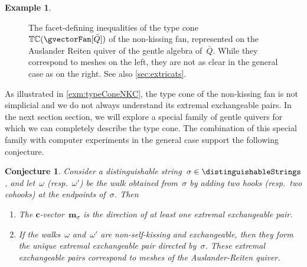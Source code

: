 \documentclass{amsart}
\newtheorem{conjecture}[theorem]{Conjecture}
\theoremstyle{definition}
\newtheorem{example}[theorem]{Example}
\renewcommand{\b}[1]{{\boldsymbol{#1}}} %
\newcommand{\multiplicityVector}{\b{m}} %
\newcommand{\typeCone}{\mathbb{TC}} %
\newcommand{\quiver}{\bar Q} %
\begin{document}
\begin{example}
\begin{figure}[h]
\begin{adjustbox}{center}
    \end{adjustbox}
	\caption{The facet-defining inequalities of the type cone~$\typeCone(\gvectorFan[\quiver])$ of the non-kissing fan, represented on the Auslander Reiten quiver of the gentle algebra of~$\quiver$. While they correspond to meshes on the left, they are not as clear in the general case as on the right. See also \cref{sec:extricats}.}
	\label{fig:labelFacetDefiningInequalititiesNKC}
\end{figure}
\end{example}

As illustrated in \cref{exm:typeConeNKC}, the type cone of the non-kissing fan is not simplicial and we do not always understand its extremal exchangeable pairs.
In the next section section, we will explore a special family of gentle quivers for which we can completely describe the type cone.
The combination of this special family with computer experiments in the general case support the following conjecture.

\begin{conjecture}
Consider a distinguishable string~$\sigma \in \distinguishableStrings$, and let~$\omega$ (resp.~$\omega'$) be the walk obtained from~$\sigma$ by adding two hooks (resp.~two cohooks) at the endpoints of~$\sigma$. Then
\begin{enumerate}
\item The $\b{c}$-vector~$\multiplicityVector_\sigma$ is the direction of at least one extremal exchangeable pair.
\item If the walks~$\omega$ and~$\omega'$ are non-self-kissing and exchangeable, then they form the unique extremal exchangeable pair directed by~$\sigma$. These extremal exchangeable pairs correspond to meshes of the Auslander-Reiten quiver.
\end{enumerate}
\end{conjecture}
\end{document}
